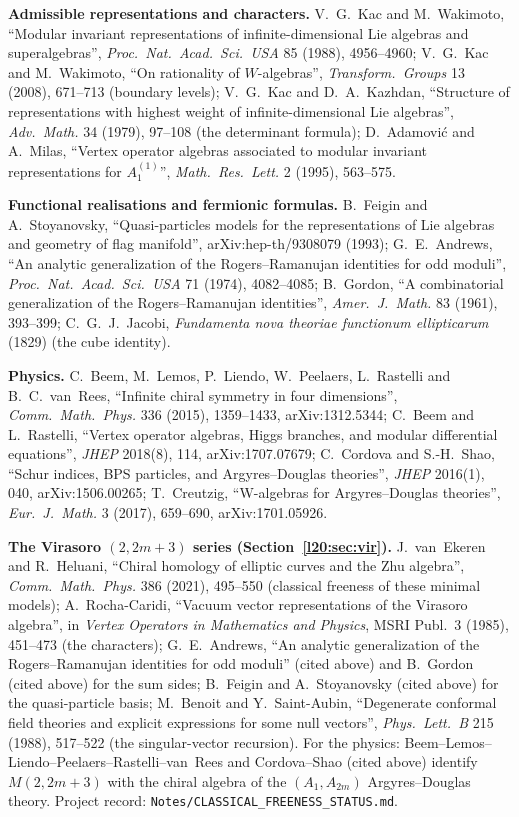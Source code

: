 \textbf{Admissible representations and characters.} V.~G.~Kac and M.~Wakimoto, ``Modular invariant representations of
infinite-dimensional Lie algebras and superalgebras'', \emph{Proc.\ Nat.\ Acad.\ Sci.\ USA} 85 (1988), 4956--4960;
V.~G.~Kac and M.~Wakimoto, ``On rationality of $W$-algebras'', \emph{Transform.\ Groups} 13 (2008), 671--713 (boundary levels);
V.~G.~Kac and D.~A.~Kazhdan, ``Structure of representations with highest weight of infinite-dimensional Lie algebras'',
\emph{Adv.\ Math.} 34 (1979), 97--108 (the determinant formula); D.~Adamovi\'c and A.~Milas, ``Vertex operator algebras
associated to modular invariant representations for $A_1^{(1)}$'', \emph{Math.\ Res.\ Lett.} 2 (1995), 563--575.

\textbf{Functional realisations and fermionic formulas.} B.~Feigin and A.~Stoyanovsky, ``Quasi-particles models for the
representations of Lie algebras and geometry of flag manifold'', arXiv:hep-th/9308079 (1993); G.~E.~Andrews, ``An analytic
generalization of the Rogers--Ramanujan identities for odd moduli'', \emph{Proc.\ Nat.\ Acad.\ Sci.\ USA} 71 (1974),
4082--4085; B.~Gordon, ``A combinatorial generalization of the Rogers--Ramanujan identities'', \emph{Amer.\ J.\ Math.} 83
(1961), 393--399; C.~G.~J.~Jacobi, \emph{Fundamenta nova theoriae functionum ellipticarum} (1829) (the cube identity).

\textbf{Physics.} C.~Beem, M.~Lemos, P.~Liendo, W.~Peelaers, L.~Rastelli and B.~C.~van~Rees, ``Infinite chiral symmetry in four
dimensions'', \emph{Comm.\ Math.\ Phys.} 336 (2015), 1359--1433, arXiv:1312.5344; C.~Beem and L.~Rastelli, ``Vertex operator
algebras, Higgs branches, and modular differential equations'', \emph{JHEP} 2018(8), 114, arXiv:1707.07679; C.~Cordova and
S.-H.~Shao, ``Schur indices, BPS particles, and Argyres--Douglas theories'', \emph{JHEP} 2016(1), 040, arXiv:1506.00265;
T.~Creutzig, ``W-algebras for Argyres--Douglas theories'', \emph{Eur.\ J.\ Math.} 3 (2017), 659--690, arXiv:1701.05926.

\textbf{The Virasoro $(2,2m+3)$ series (Section~\ref{l20:sec:vir}).} J.~van~Ekeren and R.~Heluani, ``Chiral homology of elliptic
curves and the Zhu algebra'', \emph{Comm.\ Math.\ Phys.} 386 (2021), 495--550 (classical freeness of these minimal models);
A.~Rocha-Caridi, ``Vacuum vector representations of the Virasoro algebra'', in \emph{Vertex Operators in Mathematics and Physics},
MSRI Publ.\ 3 (1985), 451--473 (the characters); G.~E.~Andrews, ``An analytic generalization of the Rogers--Ramanujan identities for
odd moduli'' (cited above) and B.~Gordon (cited above) for the sum sides; B.~Feigin and A.~Stoyanovsky (cited above) for the
quasi-particle basis; M.~Benoit and Y.~Saint-Aubin, ``Degenerate conformal field theories and explicit expressions for some null
vectors'', \emph{Phys.\ Lett.\ B} 215 (1988), 517--522 (the singular-vector recursion). For the physics: Beem--Lemos--Liendo--Peelaers--Rastelli--van~Rees
and Cordova--Shao (cited above) identify $M(2,2m+3)$ with the chiral algebra of the $(A_1,A_{2m})$ Argyres--Douglas theory.
Project record: \texttt{Notes/CLASSICAL\_FREENESS\_STATUS.md}.

